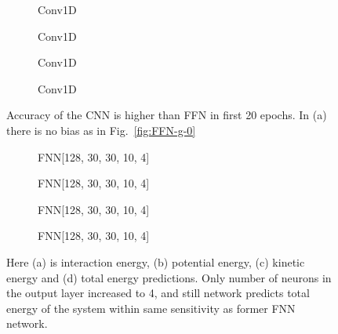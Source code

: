 \documentclass[a4paper,times,12pt]{article}
\begin{document}
\begin{figure}[H]
    \centering
    \begin{subfigure}[t]{0.45\textwidth}
		\centering
        
        \caption{Conv1D}
		\label{fig:a}
    \end{subfigure}\hfill
    \begin{subfigure}[t]{0.45\textwidth}
		\centering
        
        \caption{Conv1D}
		\label{fig:b}
    \end{subfigure}\hfill    
    \begin{subfigure}[t]{0.45\textwidth}
        \centering
        
        \caption{Conv1D}
		\label{fig:c}
    \end{subfigure}\hfill
    \begin{subfigure}[t]{0.45\textwidth}
        \centering
        
        \caption{Conv1D}
		\label{fig:c}
    \end{subfigure}
    \caption{Accuracy of the CNN is higher than FFN in first 20 epochs. In (a) there is no bias as in Fig.~\ref{fig:FFN-g-0}}
\end{figure}

\begin{figure}[H]
    \centering
    \begin{subfigure}[t]{0.45\textwidth}
		\centering
        
        \caption{FNN[128, 30, 30, 10, 4]}
		\label{fig:a}
    \end{subfigure}\hfill
    \begin{subfigure}[t]{0.45\textwidth}
		\centering
        
        \caption{FNN[128, 30, 30, 10, 4]}
		\label{fig:b}
    \end{subfigure}\hfill    
    \begin{subfigure}[t]{0.45\textwidth}
        \centering
        
        \caption{FNN[128, 30, 30, 10, 4]}
		\label{fig:c}
    \end{subfigure}\hfill
    \begin{subfigure}[t]{0.45\textwidth}
        \centering
        
        \caption{FNN[128, 30, 30, 10, 4]}
		\label{fig:c}
    \end{subfigure}
	\caption{Here (a) is interaction energy, (b) potential energy, (c) kinetic energy and (d) total energy predictions. Only number of neurons in the output layer increased to 4, and still network predicts total energy of the system within same sensitivity as former FNN network.}
\end{figure}
\end{document}

